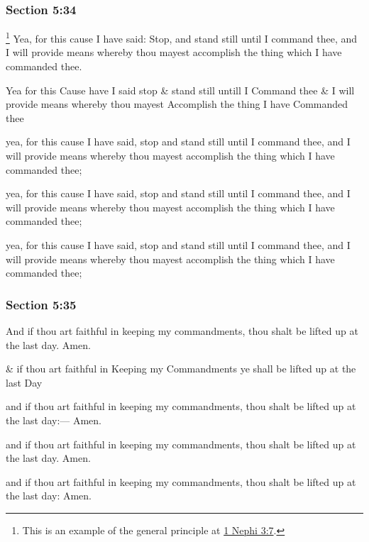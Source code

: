 	\subsubsection{Section 5:34} %
		\label{DC5-34}

			\footnote{%
				This is an example of the general principle at \hyperref[1NEPHI-3-7]{1 Nephi 3:7}.
				}%
		Yea, for this cause I have said: Stop, and stand still until I command thee, and I will provide means whereby thou mayest accomplish the thing which I have commanded thee.

		\begin{framed}
		\scriptsize
			\begin{compactdesc}
				\item[JSP] Yea for this Cause have I said stop \& stand still untill I Command thee \& I will provide means whereby thou mayest Accomplish the thing I have Commanded thee
				\item[RB1] [\textit{missing}]
				\item[BC] yea, for this cause I have said, stop and stand still until I command thee, and I will provide means whereby thou mayest accomplish the thing which I have commanded thee;
				\item[DC 1835] yea, for this cause I have said, stop and stand still until I command thee, and I will provide means whereby thou mayest accomplish the thing which I have commanded thee;
				\item[DC 1844] yea, for this cause I have said, stop and stand still until I command thee, and I will provide means whereby thou mayest accomplish the thing which I have commanded thee;
			\end{compactdesc}
		\end{framed}

	\subsubsection{Section 5:35} %
		\label{DC5-35}

		And if thou art faithful in keeping my commandments, thou shalt be lifted up at the last day. Amen.

		\begin{framed}
		\scriptsize
			\begin{compactdesc}
				\item[JSP] \& if thou art faithful in Keeping my Commandments ye shall be lifted up at the last Day
				\item[RB1] [\textit{missing}]
				\item[BC] and if thou art faithful in keeping my commandments, thou shalt be lifted up at the last day:--- Amen.
				\item[DC 1835] and if thou art faithful in keeping my commandments, thou shalt be lifted up at the last day. Amen.
				\item[DC 1844] and if thou art faithful in keeping my commandments, thou shalt be lifted up at the last day: Amen.
			\end{compactdesc}
		\end{framed}